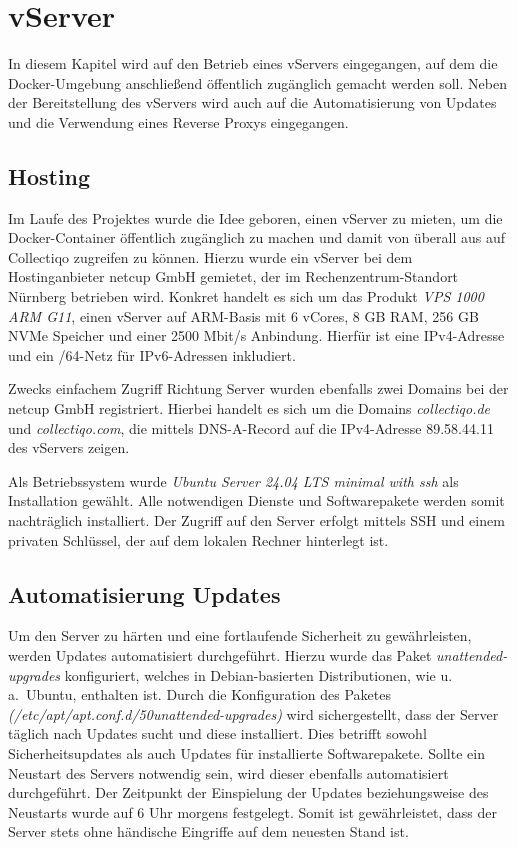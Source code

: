 \section{vServer}\label{subsec:vserver}

In diesem Kapitel wird auf den Betrieb eines vServers eingegangen, auf dem die Docker-Umgebung anschließend öffentlich zugänglich gemacht werden soll.
Neben der Bereitstellung des vServers wird auch auf die Automatisierung von Updates und die Verwendung eines Reverse Proxys eingegangen.

\subsection{Hosting}\label{subsubsec:hosting}

Im Laufe des Projektes wurde die Idee geboren, einen vServer zu mieten, um die Docker-Container öffentlich zugänglich zu machen und damit von überall aus auf Collectiqo zugreifen zu können.
Hierzu wurde ein vServer bei dem Hostinganbieter netcup GmbH gemietet, der im Rechenzentrum-Standort Nürnberg betrieben wird.
Konkret handelt es sich um das Produkt \textit{VPS 1000 ARM G11}, einen vServer auf ARM-Basis mit 6 vCores, 8 GB RAM, 256 GB NVMe Speicher und einer 2500 Mbit/s Anbindung.
Hierfür ist eine IPv4-Adresse und ein /64-Netz für IPv6-Adressen inkludiert.

Zwecks einfachem Zugriff Richtung Server wurden ebenfalls zwei Domains bei der netcup GmbH registriert.
Hierbei handelt es sich um die Domains \textit{collectiqo.de} und \textit{collectiqo.com}, die mittels DNS-A-Record auf die IPv4-Adresse 89.58.44.11 des vServers zeigen.

Als Betriebssystem wurde \textit{Ubuntu Server 24.04 LTS minimal with ssh} als Installation gewählt.
Alle notwendigen Dienste und Softwarepakete werden somit nachträglich installiert.
Der Zugriff auf den Server erfolgt mittels SSH und einem privaten Schlüssel, der auf dem lokalen Rechner hinterlegt ist.

\subsection{Automatisierung Updates}\label{subsubsec:automatisierung-updates}

Um den Server zu härten und eine fortlaufende Sicherheit zu gewährleisten, werden Updates automatisiert durchgeführt.
Hierzu wurde das Paket \textit{unattended-upgrades} konfiguriert, welches in Debian-basierten Distributionen, wie u.\,a.\ Ubuntu, enthalten ist.
Durch die Konfiguration des Paketes \textit{(/etc/apt/apt.conf.d/50unattended-upgrades)} wird sichergestellt, dass der Server täglich nach Updates sucht und diese installiert.
Dies betrifft sowohl Sicherheitsupdates als auch Updates für installierte Softwarepakete.
Sollte ein Neustart des Servers notwendig sein, wird dieser ebenfalls automatisiert durchgeführt.
Der Zeitpunkt der Einspielung der Updates beziehungsweise des Neustarts wurde auf 6 Uhr morgens festgelegt.
Somit ist gewährleistet, dass der Server stets ohne händische Eingriffe auf dem neuesten Stand ist.

